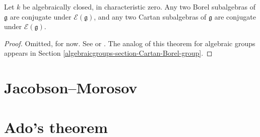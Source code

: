 \begin{theorem}
\label{theorem-conjugacy-Borel-Cartan}
 Let $k$ be algebraically closed, in characteristic zero. Any two Borel subalgebras of $\mathfrak g$ are conjugate under $\mathcal E(\mathfrak g)$, and any two Cartan subalgebras of $\mathfrak g$ are conjugate under $\mathcal E(\mathfrak g)$.
\end{theorem}

\begin{proof}
 Omitted, for now. See \cite{Humphreys-Lie} or \cite{Sternberg}. The analog of this theorem for algebraic groups appears in Section \ref{algebraicgroups-section-Cartan-Borel-group}.
\end{proof}




\section{Jacobson--Morosov}
\label{section-Jacobson-Morosov}

\section{Ado's theorem}
\label{section-Ado}


















